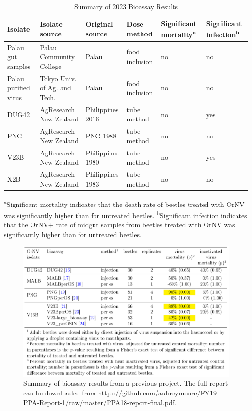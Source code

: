 \documentclass[12pt,letterpaper,english,bibliography=totocnumbered, abstract=on]{scrartcl}
\begin{document}
\begin{table}[H]
	\footnotesize
	\centering
	\caption{Summary of 2023 Bioassay Results}
	\label{tab:bioassay_summary}
	\begin{tabular}{l p{1in} p{1in} p{.5in} p{.75in} p{.75in}}
		\toprule
		Isolate & Isolate source & Original source  & Dose method & Significant mortality\textsuperscript{a} & Significant infection\textsuperscript{b} \\ \midrule
		Palau gut samples & Palau Community College & Palau & food inclusion & no & no \\ \midrule
		Palau purified virus & Tokyo Univ. of Ag. and Tech. & Palau & food inclusion & no & no \\ \midrule
		DUG42                & AgResearch New Zealand & Philippines 2016 & tube method & no & yes\\ \midrule
		PNG                  & AgResearch New Zealand & PNG 1988         & tube method & no & no  \\ \midrule
		V23B                 & AgResearch New Zealand & Philippines 1980 & tube method & no & yes \\ \midrule
		X2B                  & AgResearch New Zealand & Philippines 1983 & tube method & no & no \\ \bottomrule
	\end{tabular}
\end{table}
\begin{footnotesize}
\textsuperscript{a}Significant mortality indicates that the death rate of beetles treated with OrNV was significantly higher than for untreated beetles. \textsuperscript{b}Significant infection indicates that the OrNV+ rate of midgut samples from beetles treated with OrNV was significantly higher than for untreated beetles.
\end{footnotesize}

\begin{figure}[H]
	\centering
	\caption{Summary of bioassay results from a previous project. The full report can be downloaded from 			\url{https://github.com/aubreymoore/FY19-PPA-Report-1/raw/master/PPA18-report-final.pdf}.}
	\label{fig:previousbioassays}
	\includegraphics[width=\linewidth]{images/previous_bioassays}
\end{figure}
\end{document}
